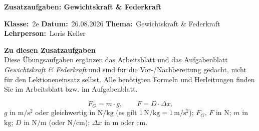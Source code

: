 \documentclass[addpoints,11pt,a4paper]{exam}
\newenvironment{infobox}{%
  \par\addvspace{10pt}\noindent
}{%
  \par\addvspace{10pt}
}
\newcommand{\Kopfzeile}[4]{%
  \begin{titlebox}
    {\color{white}\sffamily\bfseries\Large #4}
  \end{titlebox}
  \vspace{0.5em}
  \noindent\textbf{Klasse:}~#1 \hfill \textbf{Datum:}~#2 \hfill \textbf{Thema:}~#3
    \hfill \textbf{Lehrperson:}~Loris Keller
  \vspace{0.8em}
  \lhead{\textcolor{darkgray}{#3}}
  \rhead{\textcolor{darkgray}{#4}}
}
\newcommand{\Klasse}{2e}
\newcommand{\Datum}{26.08.2026}
\newcommand{\Thema}{Gewichtskraft \& Federkraft}
\newcommand{\ZusatzaufgabenTitel}{Zusatzaufgaben: Gewichtskraft \& Federkraft}
\begin{document}
\Kopfzeile{\Klasse}{\Datum}{\Thema}{\ZusatzaufgabenTitel}

\begin{infobox}
\textbf{Zu diesen Zusatzaufgaben}\\
Diese Übungsaufgaben ergänzen das Arbeitsblatt und das Aufgabenblatt
\emph{Gewichtskraft \& Federkraft} und sind für die Vor-/Nachbereitung
gedacht, nicht für den Lektioneneinsatz selbst. Alle benötigten Formeln
und Herleitungen finden Sie im Arbeitsblatt bzw. im Aufgabenblatt.
\end{infobox}

\begin{formelbox}[Formelsammlung]
\[
  F_G = m\cdot g, \qquad F = D\cdot\Delta x.
\]
$g$ in $\si{\meter\per\second\squared}$ oder gleichwertig in
$\si{\newton\per\kilogram}$ (es gilt $1\,\si{\newton\per\kilogram} =
1\,\si{\meter\per\second\squared}$); $F_G$, $F$ in $\si{\newton}$; $m$ in
$\si{\kilogram}$; $D$ in $\si{\newton\per\meter}$ (oder
$\si{\newton\per\centi\meter}$); $\Delta x$ in $\si{\meter}$ oder
$\si{\centi\meter}$.
\end{formelbox}
\end{document}
